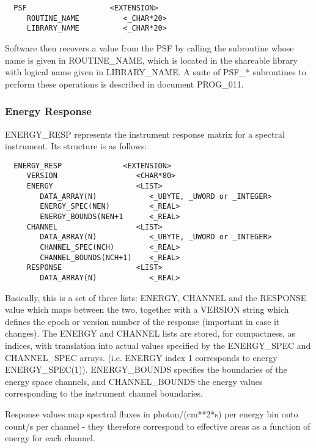 \begin{verbatim}
  PSF                   <EXTENSION>
     ROUTINE_NAME          <_CHAR*20>
     LIBRARY_NAME          <_CHAR*20>
\end{verbatim}

Software then recovers a value from the PSF by calling the  subroutine
whose name is given in ROUTINE\_NAME, which is located in the shareable
library with logical name given in LIBRARY\_NAME.   A  suite  of  PSF\_*
subroutines  to  perform  these  operations  is  described in document
PROG\_011.

\subsubsection{Energy Response}

ENERGY\_RESP   represents   the   instrument
response  matrix  for  a  spectral  instrument.   Its  structure is as
follows:

\begin{verbatim}
  ENERGY_RESP              <EXTENSION>
     VERSION                  <CHAR*80>
     ENERGY                   <LIST>
        DATA_ARRAY(N)            <_UBYTE, _UWORD or _INTEGER>
        ENERGY_SPEC(NEN)         <_REAL>
        ENERGY_BOUNDS(NEN+1      <_REAL>
     CHANNEL                  <LIST>
        DATA_ARRAY(N)            <_UBYTE, _UWORD or _INTEGER>
        CHANNEL_SPEC(NCH)        <_REAL>
        CHANNEL_BOUNDS(NCH+1)    <_REAL>
     RESPONSE                 <LIST>
        DATA_ARRAY(N)            <_REAL>
\end{verbatim}

Basically, this is a set of three  lists:   ENERGY,  CHANNEL  and  the
RESPONSE  value  which  maps  between the two, together with a VERSION
string which defines the epoch  or  version  number  of  the  response
(important  in  case  it  changes).   The ENERGY and CHANNEL lists are
stored, for compactness, as  indices,  with  translation  into  actual
values  specified  by  the ENERGY\_SPEC and CHANNEL\_SPEC arrays.  (i.e.
ENERGY index 1 corresponds to energy  ENERGY\_SPEC(1)).   ENERGY\_BOUNDS
specifies   the   boundaries   of   the  energy  space  channels,  and
CHANNEL\_BOUNDS the  energy  values  corresponding  to  the  instrument
channel boundaries.

Response values map spectral fluxes in photon/(cm**2*s) per energy bin
onto  count/s  per  channel  -  they therefore correspond to effective
areas as a function of energy for each channel.

